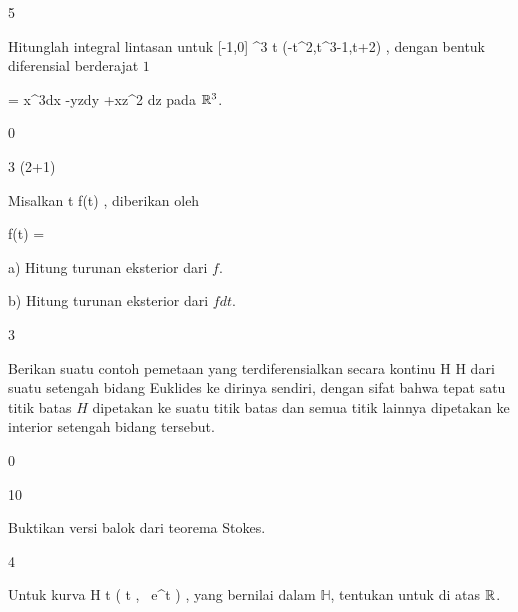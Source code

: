 {5}
{

Hitunglah integral lintasan
\mathl{\int_\gamma \omega}{} untuk
\maabbeledisp {\gamma} { [-1,0] } {\R^3
} { t } {(-t^2,t^3-1,t+2)
} {,}
dengan bentuk diferensial berderajat $1$

\mavergleichskettedisp
{\vergleichskette
{ \omega
}
{ =} { x^3dx -yzdy +xz^2 dz
}
{ } {
}
{ } {
}
{ } {
}
}
{}{}{}
pada ${\mathbb R}^3$.

}
{} {}

{0}
{

}
{} {}

{3 (2+1)}
{

Misalkan
 {\R} {\R
} { t } {f(t)
} {,}
diberikan oleh

\mavergleichskettedisp
{\vergleichskette
{ f(t)
}
{ =} { {  }
}
{ } {
}
{ } {
}
{ } {
}
}
{}{}{}

a) Hitung turunan eksterior dari $f$.

b) Hitung turunan eksterior dari $fdt$.

}
{} {}

{3}
{

Berikan suatu contoh pemetaan yang terdiferensialkan secara kontinu
\maabbdisp {\varphi} { H } { H
} {}
dari suatu setengah bidang Euklides ke dirinya sendiri, dengan sifat bahwa tepat satu titik batas $H$ dipetakan ke suatu titik batas dan semua titik lainnya dipetakan ke interior setengah bidang tersebut.

}
{} {}

{0}
{

}
{} {}

{10}
{

Buktikan versi balok dari teorema Stokes.

}
{} {}

{4}
{

Untuk kurva
\maabbeledisp {\psi} {\R} { {\mathbb H}
} { t } { \left(  t   , \,  e^t                   \right)
} {,}
yang bernilai dalam
${\mathbb H}$, tentukan
untuk
 {} {}
di atas ${\mathbb R}$.

}
{} {}
